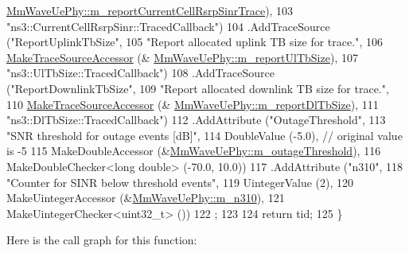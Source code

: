 \begin{DoxyCode}
      \hyperlink{classns3_1_1MmWaveUePhy_a5c7ac135bd3be4b3cc9fbb14a49961e3}{MmWaveUePhy::m\_reportCurrentCellRsrpSinrTrace}),
103                                                  \textcolor{stringliteral}{"ns3::CurrentCellRsrpSinr::TracedCallback"})
104                 .AddTraceSource (\textcolor{stringliteral}{"ReportUplinkTbSize"},
105                                                  \textcolor{stringliteral}{"Report allocated uplink TB size for trace."},
106                                                  \hyperlink{group__tracing_gab21a770b9855af4e8f69f7531ea4a6b0}{MakeTraceSourceAccessor} (&
      \hyperlink{classns3_1_1MmWaveUePhy_af182f14fb53bb3fea59e51d420fe0489}{MmWaveUePhy::m\_reportUlTbSize}),
107                                                  \textcolor{stringliteral}{"ns3::UlTbSize::TracedCallback"})
108                 .AddTraceSource (\textcolor{stringliteral}{"ReportDownlinkTbSize"},
109                                                  \textcolor{stringliteral}{"Report allocated downlink TB size for trace."},
110                                                  \hyperlink{group__tracing_gab21a770b9855af4e8f69f7531ea4a6b0}{MakeTraceSourceAccessor} (&
      \hyperlink{classns3_1_1MmWaveUePhy_aa64fc9fd78f026c8792d91b12c6b40d7}{MmWaveUePhy::m\_reportDlTbSize}),
111                                                  \textcolor{stringliteral}{"ns3::DlTbSize::TracedCallback"})
112                 .AddAttribute (\textcolor{stringliteral}{"OutageThreshold"},
113                    \textcolor{stringliteral}{"SNR threshold for outage events [dB]"},
114                    DoubleValue (-5.0), \textcolor{comment}{// original value is -5}
115                    MakeDoubleAccessor (&\hyperlink{classns3_1_1MmWaveUePhy_a70f5b46f9b554efd5c33d859250056ce}{MmWaveUePhy::m\_outageThreshold}),
116                    MakeDoubleChecker<long double> (-70.0, 10.0))
117                 .AddAttribute (\textcolor{stringliteral}{"n310"},
118                    \textcolor{stringliteral}{"Counter for SINR below threshold events"},
119                    UintegerValue (2),
120                    MakeUintegerAccessor (&\hyperlink{classns3_1_1MmWaveUePhy_ab1c52c20727e1c5a2fdf1599c0d5d3f5}{MmWaveUePhy::m\_n310}),
121                    MakeUintegerChecker<uint32\_t> ())
122 ;
123 
124         \textcolor{keywordflow}{return} tid;
125 \}
\end{DoxyCode}


Here is the call graph for this function\+:


